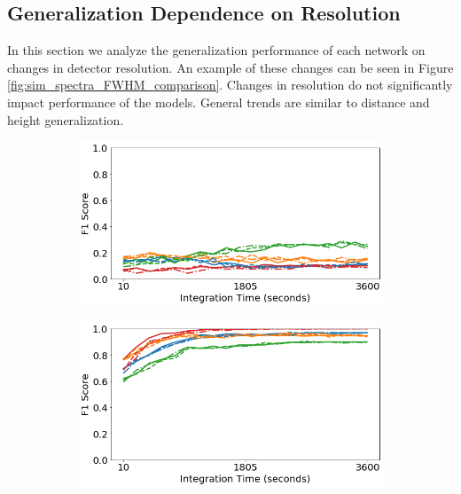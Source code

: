 \subsection{Generalization Dependence on Resolution}

In this section we analyze the generalization performance of each network on changes in detector resolution. An example of these changes can be seen in Figure \ref{fig:sim_spectra_FWHM_comparison}. Changes in resolution do not significantly impact performance of the models. General trends are similar to distance and height generalization.


\begin{figure}[H]
     \centering
     \begin{subfigure}[b]{0.49\textwidth}
         \centering
         \includegraphics[width=\textwidth]{images/generalization-fwhm-easy-01.png}
         \caption{}
         \label{fig:generalization-fwhm-easy-01}
     \end{subfigure}
     \hfill
     \begin{subfigure}[b]{0.49\textwidth}
         \centering
         \includegraphics[width=\textwidth]{images/generalization-fwhm-easy-05.png}
         \caption{}
         \label{fig:generalization-fwhm-easy-05}
     \end{subfigure}


\end{figure}
